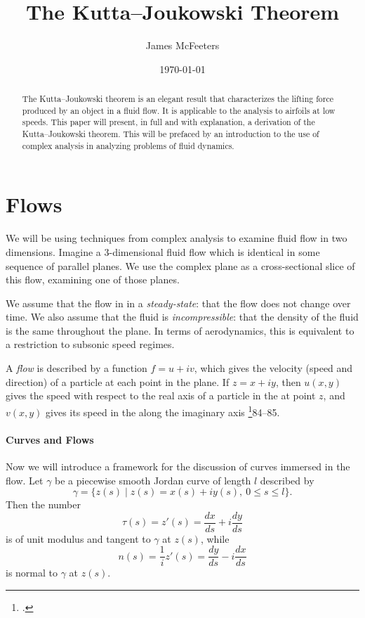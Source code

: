 \documentclass[letterpaper, twoside, 12 pt]{article}
\title{The Kutta--Joukowski Theorem}
\date{\today}
\author{James McFeeters}
\begin{document}
	\maketitle

\begin{abstract}
	The Kutta--Joukowski theorem is an elegant result that characterizes the lifting force produced by an object in a fluid flow. 
	It is applicable to the analysis to airfoils at low speeds.
	This paper will present, in full and with explanation, a derivation of the Kutta--Joukowski theorem.
	This will be prefaced by an introduction to the use of complex analysis in analyzing problems of fluid dynamics.
\end{abstract}

\setlength{\parindent}{0 pt}
\setlength{\parskip}{1 em}

\section{Flows} %
\label{sec:flows}
	We will be using techniques from complex analysis to examine fluid flow in two dimensions.
	Imagine a 3-dimensional fluid flow which is identical in some sequence of parallel planes.
	We use the complex plane as a cross-sectional slice of this flow, examining one of those planes.

	We assume that the flow in in a \textit{steady-state}: that the flow does not change over time.
	We also assume that the fluid is \textit{incompressible}: that the density of the fluid is the same throughout the plane.
	In terms of aerodynamics, this is equivalent to a restriction to subsonic speed regimes.

	\begin{definition}[Flow]
		A \textit{flow} is described by a function $f = u + iv$, which gives the velocity (speed and direction) of a particle at each point in the plane.
		If $z = x + iy$, then $u(x, y)$ gives the speed with respect to the real axis of a particle in the at point $z$, and $v(x, y)$ gives its speed in the along the imaginary axis \footcite{fisher}{84--85}.
	\end{definition}

	\paragraph*{Curves and Flows}
	Now we will introduce a framework for the discussion of curves immersed in the flow.
	Let $\gamma$ be a piecewise smooth Jordan curve of length $l$ described by
	\[
		\gamma = \{ z(s) \mid z(s) = x(s) + i y(s), \ 0 \leq s \leq l \}.
	\]
	Then the number 
	\[
		\tau(s) = z'(s) = \frac{dx}{ds} + i \frac{dy}{ds}
	\]
	is of unit modulus and tangent to $\gamma$ at $z(s)$, while
	\[
		n(s) = \frac{1}{i} z'(s) = \frac{dy}{ds} - i \frac{dx}{ds}
	\]
	is normal to $\gamma$ at $z(s)$.
\end{document}
